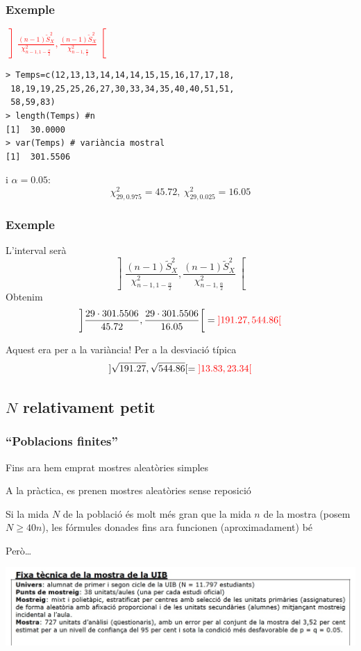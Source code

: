 \documentclass[12pt,t]{beamer}
\newcommand{\red}[1]{\textcolor{red}{#1}}
\renewcommand{\geq}{\geqslant}
\theoremstyle{plain}
\theoremstyle{definition}
\begin{document}
\begin{frame}[fragile]
\frametitle{Exemple}
\red{$\displaystyle \left] \frac{(n-1)\widetilde{S}_{X}^2}{\chi_{n-1,1-\frac{\alpha}{2}}^2},
\frac{(n-1)\widetilde{S}_{X}^2}{\chi_{n-1,\frac{\alpha}{2}}^2}
\right[$}

\begin{verbatim}
> Temps=c(12,13,13,14,14,14,15,15,16,17,17,18,
 18,19,19,25,25,26,27,30,33,34,35,40,40,51,51,
 58,59,83)
> length(Temps) #n
[1]  30.0000
> var(Temps) # variància mostral
[1]  301.5506
\end{verbatim}
i  $\alpha=0.05$:
$$
\chi_{29,0.975}^2=45.72,\
\chi_{29,0.025}^2=16.05
$$
\end{frame}

\begin{frame} 
\frametitle{Exemple}

L'interval serà
$$
\left] \frac{(n-1)\widetilde{S}_{X}^2}{\chi_{n-1,1-\frac{\alpha}{2}}^2},
\frac{(n-1)\widetilde{S}_{X}^2}{\chi_{n-1,\frac{\alpha}{2}}^2}
\right[
$$
Obtenim
$$
\left] \frac{29\cdot 301.5506}{45.72},
\frac{29\cdot 301.5506}{16.05}
\right[=
\red{]191.27, 544.86[}
$$
\pause

Aquest era per a la variància! Per a la desviació típica
$$
]\sqrt{191.27}, \sqrt{544.86}[=\red{]13.83,23.34[}
$$

\end{frame}

\subsection{$N$ relativament petit}
\begin{frame}
\frametitle{``Poblacions finites''}
Fins ara hem emprat mostres aleatòries simples
\medskip

A la pràctica,  es prenen mostres aleatòries sense reposició
\medskip

Si la mida $N$ de la població és molt més gran que la mida $n$ de la mostra (posem $N\geq 40n$), les fórmules donades fins ara funcionen (aproximadament) bé
\medskip

Però\ldots
\vspace*{-4ex}

\begin{center}
\hspace*{-0.5cm}\includegraphics[width=1.1\linewidth]{plagiUIB2.jpg}
\end{center}


\end{frame}
\end{document}
